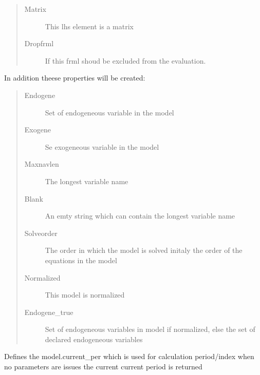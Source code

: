 \documentclass[letterpaper,10pt,english]{sphinxmanual}
\begin{document}
\begin{fulllineitems}
\begin{fulllineitems}
\begin{quote}
\begin{description}
\item[{Matrix}] \leavevmode
\sphinxAtStartPar
This lhs element is a matrix

\item[{Dropfrml}] \leavevmode
\sphinxAtStartPar
If this frml shoud be excluded from the evaluation.

\end{description}\end{quote}

\sphinxAtStartPar
In addition theese properties will be created:
\begin{quote}\begin{description}
\item[{Endogene}] \leavevmode
\sphinxAtStartPar
Set of endogeneous variable in the model

\item[{Exogene}] \leavevmode
\sphinxAtStartPar
Se exogeneous variable in the model

\item[{Maxnavlen}] \leavevmode
\sphinxAtStartPar
The longest variable name

\item[{Blank}] \leavevmode
\sphinxAtStartPar
An emty string which can contain the longest variable name

\item[{Solveorder}] \leavevmode
\sphinxAtStartPar
The order in which the model is solved \sphinxhyphen{} initaly the order of the equations in the model

\item[{Normalized}] \leavevmode
\sphinxAtStartPar
This model is normalized

\item[{Endogene\_true}] \leavevmode
\sphinxAtStartPar
Set of endogeneous variables in model if normalized, else the set of declared endogeneous variables

\end{description}\end{quote}

\end{fulllineitems}


\begin{fulllineitems}
\label{\detokenize{core/modelclass:modelclass.BaseModel.smpl}}
\pysigstartsignatures
{}
\pysigstopsignatures
\sphinxAtStartPar
Defines the model.current\_per which is used for calculation period/index
when no parameters are issues the current current period is returned


\end{fulllineitems}
\end{fulllineitems}
\end{document}
